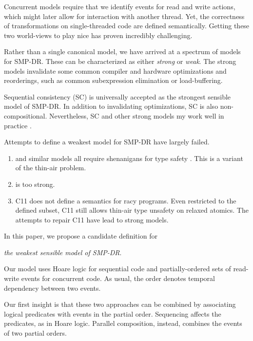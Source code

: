 Concurrent models require that we identify events for read and write actions,
which might later allow for interaction with another thread.  Yet, the
correctness of transformations on single-threaded code are defined
semantically.  Getting these two world-views to play nice has proven
incredibly challenging.

Rather than a single canonical model, we have arrived at a spectrum of models
for SMP-DR.  These can be characterized as either \emph{strong} or
\emph{weak}.  The strong models invalidate some common compiler and hardware
optimizations and reorderings, such as common subexpression elimination or
load-buffering.

Sequential consistency (SC) \citep{Lamport:1979:MMC:1311099.1311750} is
universally accepted as the strongest sensible model of SMP-DR.  In addition
to invalidating optimizations, SC is also non-compositional.  Nevertheless,
SC and other strong models my work well in practice
\cite{Singh:2012:ESC:2337159.2337220,Dolan:2018:BDR:3192366.3192421,Ou:2018:TUC:3288538.3276506,Liu:2019:ASC:3314221.3314611}.

Attempts to define a weakest model for SMP-DR have largely failed.
\begin{enumerate}
\item \citet{Manson:2005:JMM:1047659.1040336} and similar models
  \cite{DBLP:conf/esop/JagadeesanPR10,DBLP:conf/popl/KangHLVD17} all require
  shenanigans for type safety
  \cite{DBLP:journals/toplas/Lochbihler13,DBLP:conf/tldi/GotoJPR12}.  This is
  a variant of the thin-air problem.
\item \citet{DBLP:conf/lics/JeffreyR16} is too strong.
\item C11 does not define a semantics for racy programs.  Even restricted to
  the defined subset, C11 still allows thin-air type unsafety on relaxed
  atomics. The attempts to repair C11 have lead to strong models.
\end{enumerate}

In this paper, we propose a candidate definition for
\begin{center}
  \emph{the weakest sensible model of SMP-DR}.
\end{center}

Our model uses Hoare logic for sequential code and partially-ordered sets of
read-write events for concurrent code.  As usual, the order denotes temporal
dependency between two events.

Our first insight is that these two approaches can be combined by associating
logical predicates with events in the partial order.  Sequencing affects the
predicates, as in Hoare logic.  Parallel composition, instead, combines the
events of two partial orders.

